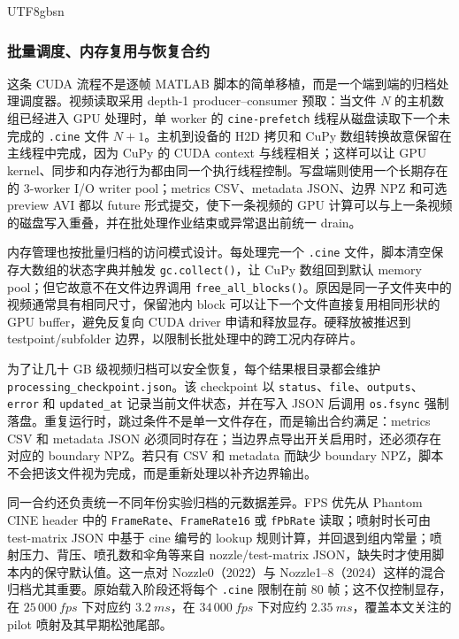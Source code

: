 \documentclass[english, 12pt, a4paper, elec, utf8, a-2b, online]{aaltothesis}
\DeclareRobustCommand{\codepath}[1]{\nolinkurl{#1}}
\begin{document}
\begin{CJK*}{UTF8}{gbsn}
\subsubsection{批量调度、内存复用与恢复合约}

这条 CUDA 流程不是逐帧 MATLAB 脚本的简单移植，而是一个端到端的归档处理调度器。视频读取采用 depth-1 producer--consumer 预取：当文件 \(N\) 的主机数组已经进入 GPU 处理时，单 worker 的 \texttt{cine-prefetch} 线程从磁盘读取下一个未完成的 \texttt{.cine} 文件 \(N+1\)。主机到设备的 H2D 拷贝和 CuPy 数组转换故意保留在主线程中完成，因为 CuPy 的 CUDA context 与线程相关；这样可以让 GPU kernel、同步和内存池行为都由同一个执行线程控制。写盘端则使用一个长期存在的 3-worker I/O writer pool；metrics CSV、metadata JSON、边界 NPZ 和可选 preview AVI 都以 future 形式提交，使下一条视频的 GPU 计算可以与上一条视频的磁盘写入重叠，并在批处理作业结束或异常退出前统一 drain。

内存管理也按批量归档的访问模式设计。每处理完一个 \texttt{.cine} 文件，脚本清空保存大数组的状态字典并触发 \texttt{gc.collect()}，让 CuPy 数组回到默认 memory pool；但它故意不在文件边界调用 \texttt{free\_all\_blocks()}。原因是同一子文件夹中的视频通常具有相同尺寸，保留池内 block 可以让下一个文件直接复用相同形状的 GPU buffer，避免反复向 CUDA driver 申请和释放显存。硬释放被推迟到 testpoint/subfolder 边界，以限制长批处理中的跨工况内存碎片。

为了让几十 GB 级视频归档可以安全恢复，每个结果根目录都会维护 \codepath{processing_checkpoint.json}。该 checkpoint 以 \texttt{status}、\texttt{file}、\texttt{outputs}、\texttt{error} 和 \texttt{updated\_at} 记录当前文件状态，并在写入 JSON 后调用 \texttt{os.fsync} 强制落盘。重复运行时，跳过条件不是单一文件存在，而是输出合约满足：metrics CSV 和 metadata JSON 必须同时存在；当边界点导出开关启用时，还必须存在对应的 boundary NPZ。若只有 CSV 和 metadata 而缺少 boundary NPZ，脚本不会把该文件视为完成，而是重新处理以补齐边界输出。

同一合约还负责统一不同年份实验归档的元数据差异。FPS 优先从 Phantom CINE header 中的 \texttt{FrameRate}、\texttt{FrameRate16} 或 \texttt{fPbRate} 读取；喷射时长可由 test-matrix JSON 中基于 cine 编号的 lookup 规则计算，并回退到组内常量；喷射压力、背压、喷孔数和伞角等来自 nozzle/test-matrix JSON，缺失时才使用脚本内的保守默认值。这一点对 Nozzle0（2022）与 Nozzle1--8（2024）这样的混合归档尤其重要。原始载入阶段还将每个 \texttt{.cine} 限制在前 80 帧；这不仅控制显存，在 \(25\,000~fps\) 下对应约 \(\SI{3.2}{ms}\)，在 \(34\,000~fps\) 下对应约 \(\SI{2.35}{ms}\)，覆盖本文关注的 pilot 喷射及其早期松弛尾部。


\end{CJK*}
\end{document}
